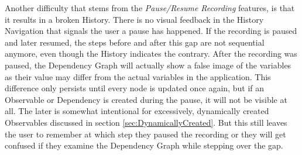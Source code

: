 Another difficulty that stems from the \emph{Pause/Resume Recording} features, is that it results in a broken History. There is no visual feedback in the History Navigation that signals the user a pause has happened. If the recording is paused and later resumed, the steps before and after this gap are not sequential anymore, even though the History indicates the contrary. After the recording was paused, the Dependency Graph will actually show a false image of the variables as their value may differ from the actual variables in the application. This difference only persists until every node is updated once again, but if an Observable or Dependency is created during the pause, it will not be visible at all. The later is somewhat intentional for excessively, dynamically created Observables discussed in section \ref{sec:DynamicallyCreated}. But this still leaves the user to remember at which step they paused the recording or they will get confused if they examine the Dependency Graph while stepping over the gap.
	
